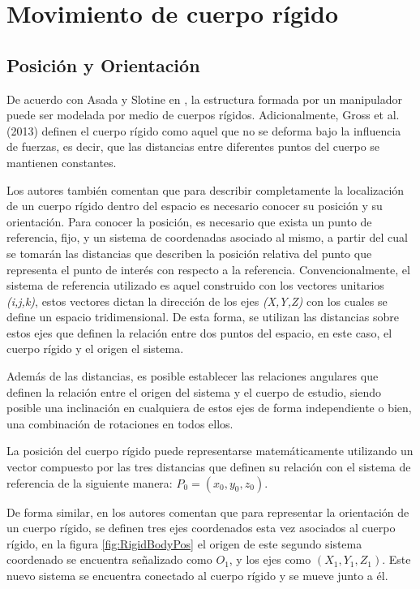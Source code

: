 \section{Movimiento de cuerpo rígido}

\subsection{Posición y Orientación}
De acuerdo con Asada y Slotine en \cite{asada_robot_1986}, la estructura formada por un manipulador puede ser modelada por medio de cuerpos rígidos. Adicionalmente, Gross et al. (2013)\cite{gross_statics_2013} definen el cuerpo rígido como aquel que no se deforma bajo la influencia de fuerzas, es decir, que las distancias entre diferentes puntos del cuerpo se mantienen constantes.

Los autores también comentan que para describir completamente la localización de un cuerpo rígido dentro del espacio es necesario conocer su posición y su orientación. Para conocer la posición, es necesario que exista un punto de referencia, fijo, y un sistema de coordenadas asociado al mismo, a partir del cual se tomarán las distancias que describen la posición relativa del punto que representa el punto de interés con respecto a la referencia. Convencionalmente, el sistema de referencia utilizado es aquel construido con los vectores unitarios \textit{(i,j,k)}, estos vectores dictan la dirección de los ejes \textit{(X,Y,Z)} con los cuales se define un espacio tridimensional. De esta forma, se utilizan las distancias sobre estos ejes que definen la relación entre dos puntos del espacio, en este caso, el cuerpo rígido y el origen el sistema. 

Además de las distancias, es posible establecer las relaciones angulares que definen la relación entre el origen del sistema y el cuerpo de estudio, siendo posible una inclinación en cualquiera de estos ejes de forma independiente o bien, una combinación de rotaciones en todos ellos. 

La posición del cuerpo rígido puede representarse matemáticamente utilizando un vector compuesto por las tres distancias que definen su relación con el sistema de referencia de la siguiente manera: $P_{0} = (x_{0},y_{0}, z_{0})$.

De forma similar, en \cite{asada_robot_1986} los autores comentan que para representar la orientación de un cuerpo rígido, se definen tres ejes coordenados esta vez asociados al cuerpo rígido, en la figura \ref{fig:RigidBodyPos} el origen de este segundo sistema coordenado se encuentra señalizado como $O_{1}$, y los ejes como $(X_{1},Y_{1},Z_{1})$. Este nuevo sistema se encuentra conectado al cuerpo rígido y se mueve junto a él. 

